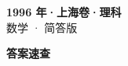 \documentclass[zihao=-4, a4paper]{ctexart}
\begin{document}
\begin{center}
  {\Large\bfseries 1996 年·上海卷·理科}\\[4pt]
  {\large 数学 · 简答版}
\end{center}
\medskip
{}

\clearpage
{}
\begin{center}{\Large\bfseries 答案速查}\end{center}
\medskip

\end{document}
